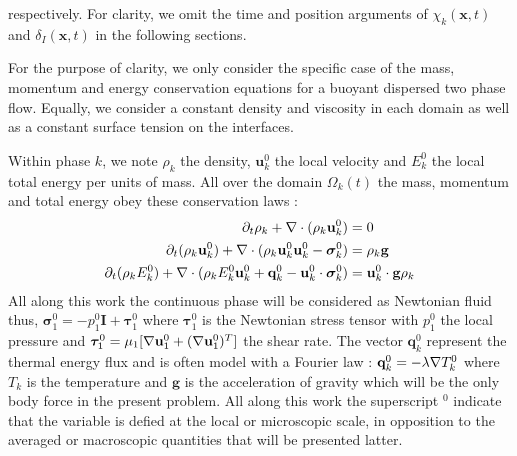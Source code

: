respectively. 
For clarity, we omit the time and position arguments of $\chi_k(\textbf{x},t)$ and $\delta_I(\textbf{x},t)$ in the following sections. 

For the purpose of clarity, we only consider the specific case of the mass, momentum and energy conservation equations for a buoyant dispersed two phase flow.
Equally, we consider a constant density and viscosity in each domain as well as a constant surface tension on the interfaces.

Within phase $k$, we note $\rho_k$ the density, $\textbf{u}_k^0$ the local velocity and $E_k^0$ the local total energy per units of mass.
All over the domain $\Omega_k(t)$ the mass, momentum and total energy obey these conservation laws :
\begin{align}
    \label{eq:dt_rho}
    \partial_t \rho_k  
    + \mathbf{\nabla}\cdot (
        \rho_k\textbf{u}_k^0
    )
    &= 
    0\\
    \label{eq:dt_rhou_k}
    \partial_t (\rho_k\textbf{u}_k^0)  
    + \mathbf{\nabla}\cdot (
        \rho_k\textbf{u}_k^0\textbf{u}_k^0
        - \bm{\sigma}_k^0 
    )
    &= 
    \rho_k \textbf{g}\\
    \label{eq:dt_rhoE_k}
    \partial_t (\rho_kE_k^0)  
    + \mathbf{\nabla}\cdot (
        \rho_kE_k^0\textbf{u}_k^0
        + \textbf{q}_k^0
        - \textbf{u}_k^0 \cdot \bm{\sigma}_k^0 
        )
    &= 
    \textbf{u}_k^0 \cdot \textbf{g}  \rho_k
\end{align} 
All along this work the continuous phase will be considered as Newtonian fluid thus, $\bm{\sigma}_1^0 = - p_1^0 \textbf{I} + \bm{\tau}_1^0$ where $\bm{\tau}_1^0$ is the Newtonian stress tensor with $p_1 ^0$ the local pressure and $\bm{\tau}_1^0 = \mu_1[\mathbf{\nabla} \textbf{u}_1^0+(\mathbf{\nabla} \textbf{u}_1^0)^T]$ the shear rate. 
The vector $\textbf{q}_k^0$ represent the thermal energy flux and is often model with a Fourier law : $\textbf{q}_k^0 = -\lambda \mathbf{\nabla} T_k^0$ where $T_k$ is the temperature and $\textbf{g}$ is the acceleration of gravity which will be the only body force in the present problem. 
All along this work the superscript $^0$ indicate that the variable is defied at the local or microscopic scale, in opposition to the averaged or macroscopic quantities that will be presented latter. 


